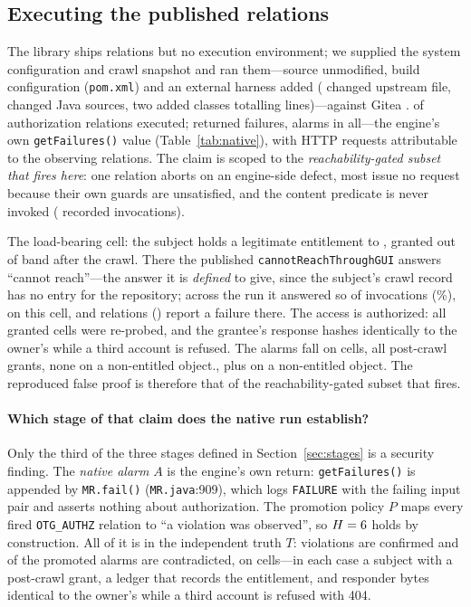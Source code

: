 \subsection{Executing the published relations}
\label{sec:native-run}

The library ships relations but no execution environment; we supplied the system configuration
and crawl snapshot and ran them---source unmodified, build configuration (\texttt{pom.xml}) and
an external harness added (\NtUpstreamModified{} changed upstream file, \NtUpstreamJavaModified{}
changed Java sources, two added classes totalling \NtHarnessLines{} lines)---against Gitea
\NtGiteaVersion{}. \NtMrExecuted{} of \NtMrTotal{} authorization relations executed; \NtMrFired{}
returned failures, \NtAlarms{} alarms in all---the engine's own \texttt{getFailures()} value
(Table~\ref{tab:native}), with \NtHttpCalls{} HTTP requests attributable to the observing
relations. The claim is scoped to the
\emph{reachability-gated subset that fires here}: one relation aborts on an engine-side defect,
most issue no request because their own guards are unsatisfied, and the content predicate is
never invoked (\NtUcrcCalls{} recorded invocations).

The load-bearing cell: the subject \NtKeyGrantee{} holds a legitimate entitlement to
\NtKeyRepo{}, granted out of band after the crawl. There the published
\texttt{cannotReachThroughGUI} answers ``cannot reach''---the answer it is \emph{defined} to
give, since the subject's crawl record has no entry for the repository; across the run it
answered so \NtCrtgTrue{} of \NtCrtgCalls{} invocations (\NtCrtgTruePct{}\%), \NtKeyCrtgTrue{}
on this cell, and \NtKeyMrFired{} relations (\NtKeyMrNames{}) report a failure there. The access
is authorized: all \NtByteCells{} granted cells were re-probed, and the grantee's response hashes
identically to the owner's while a third account is refused. The \NtAlarms{} alarms fall on
\NtAlarmCells{} cells, all post-crawl
grants\ifnum{}, none on a non-entitled object.\else, plus
\NtAlarmsOffGrant{} on a non-entitled object.\fi{} The reproduced false proof is therefore that
of the reachability-gated subset that fires.

\paragraph{Which stage of that claim does the native run establish?}
Only the third of the three stages defined in Section~\ref{sec:stages} is a security finding. The
\emph{native alarm} $A$ is the engine's own return: \texttt{getFailures()} is appended by
\texttt{MR.fail()} (\texttt{MR.java}:909), which logs \texttt{FAILURE} with the failing input pair
and asserts nothing about authorization. The promotion policy $P$ maps every fired
\texttt{OTG\_AUTHZ} relation to ``a violation was observed'', so $H=6$ holds by
construction. All of it is in the independent truth $T$: \NtStageTTrue{} violations are confirmed
and \NtStageTFalse{} of the \NtStageA{} promoted alarms are contradicted, on \NtStageTCells{}
cells---in each case a subject with a post-crawl grant, a ledger that records the entitlement, and
responder bytes identical to the owner's while a third account is refused with 404.

